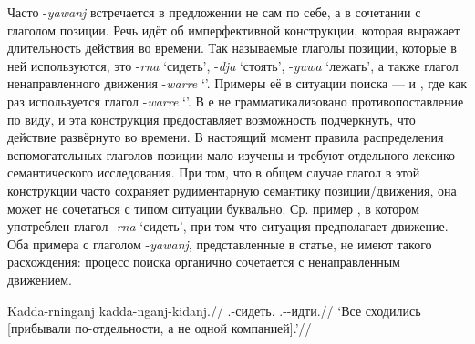 Часто -\textit{yawanj} встречается в предложении не сам по себе, а в сочетании с глаголом позиции. Речь идёт об имперфективной конструкции, которая выражает длительность действия во времени. Так называемые глаголы позиции, которые в ней используются, это -\textit{rna} `сидеть', -\textit{dja} `стоять', -\textit{yuwa} `лежать', а также глагол ненаправленного движения -\textit{warre} `\warre'. Примеры её в ситуации поиска ---  и , где как раз используется глагол -\textit{warre} `\warre'. В  е не грамматикализовано противопоставление по виду, и эта конструкция предоставляет возможность подчеркнуть, что действие развёрнуто во времени. В настоящий момент правила распределения вспомогательных глаголов позиции мало изучены и требуют отдельного лексико-семантического исследования. При том, что в общем случае глагол в этой конструкции часто сохраняет рудиментарную семантику позиции/движения, она может не сочетаться с типом ситуации буквально. Ср. пример , в котором употреблен глагол -\textit{rna} `сидеть', при том что ситуация предполагает движение. Оба примера с глаголом -\textit{yawanj}, представленные в статье, не имеют такого расхождения: процесс поиска органично сочетается с ненаправленным движением. 

\begingl
\gla Kadda-rninganj kadda-nganj-kidanj.//
\glb \Tpl.\Real-сидеть.\Pst{} \Tpl.\Real-\Hith-идти.\Pst{}//
\glft `Все сходились [прибывали по-отдельности, а не одной компанией].'//%
\endgl\xe

